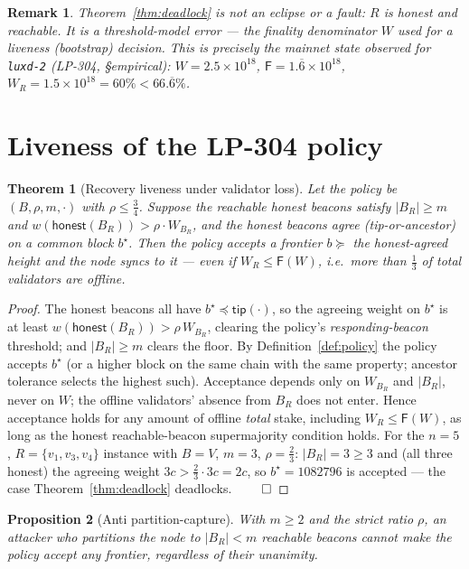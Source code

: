 \documentclass[11pt]{article}
\newtheorem{theorem}{Theorem}
\newtheorem{proposition}[theorem]{Proposition}
\newtheorem{remark}{Remark}
\begin{document}
\begin{remark}
Theorem~\ref{thm:deadlock} is not an eclipse or a fault: $R$ is honest and reachable. It is a
threshold-model error --- the \emph{finality} denominator $W$ used for a \emph{liveness}
(bootstrap) decision. This is precisely the mainnet state observed for \texttt{luxd-2}
(LP-304, \S empirical): $W=2.5\times10^{18}$, $\mathsf{F}=1.\overline{6}\times10^{18}$,
$W_R=1.5\times10^{18}=60\%<66.\overline{6}\%$.
\end{remark}

\section{Liveness of the LP-304 policy}

\begin{theorem}[Recovery liveness under validator loss]\label{thm:liveness}
Let the policy be $(B,\rho,m,\cdot)$ with $\rho\le\tfrac34$. Suppose the reachable honest
beacons satisfy $|B_R|\ge m$ and $w(\mathsf{honest}(B_R))>\rho\cdot W_{B_R}$, and the honest
beacons agree (tip-or-ancestor) on a common block $b^\star$. Then the policy accepts a
frontier $b\succeq$ the honest-agreed height and the node syncs to it --- even if
$W_R\le \mathsf{F}(W)$, i.e.\ more than $\tfrac13$ of \emph{total} validators are offline.
\end{theorem}

\begin{proof}
The honest beacons all have $b^\star\preceq\mathsf{tip}(\cdot)$, so the agreeing weight on
$b^\star$ is at least $w(\mathsf{honest}(B_R))>\rho\,W_{B_R}$, clearing the policy's
\emph{responding-beacon} threshold; and $|B_R|\ge m$ clears the floor. By
Definition~\ref{def:policy} the policy accepts $b^\star$ (or a higher block on the same chain
with the same property; ancestor tolerance selects the highest such). Acceptance depends only
on $W_{B_R}$ and $|B_R|$, never on $W$; the offline validators' absence from $B_R$ does not
enter. Hence acceptance holds for any amount of offline \emph{total} stake, including
$W_R\le\mathsf{F}(W)$, as long as the honest reachable-beacon supermajority condition holds.
For the $n=5$, $R=\{v_1,v_3,v_4\}$ instance with $B=V$, $m=3$, $\rho=\tfrac23$: $|B_R|=3\ge 3$
and (all three honest) the agreeing weight $3c>\tfrac23\cdot 3c=2c$, so $b^\star=1082796$ is
accepted --- the case Theorem~\ref{thm:deadlock} deadlocks. $\qed$
\end{proof}

\begin{proposition}[Anti partition-capture]\label{prop:floor}
With $m\ge 2$ and the strict ratio $\rho$, an attacker who partitions the node to
$|B_R|<m$ reachable beacons cannot make the policy accept any frontier, regardless of their
unanimity.
\end{proposition}
\end{document}
